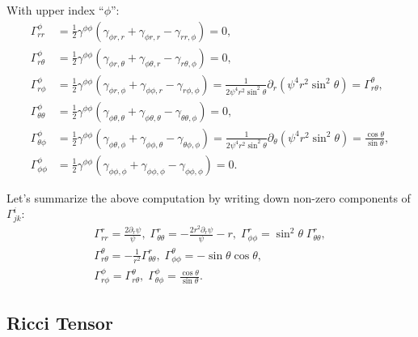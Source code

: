 \documentclass[aps,prd,preprint]{revtex4-1}
\begin{document}
With upper index ``$\phi$'':
\begin{align}
%
%
\Gamma^\phi_{rr} & = \frac{1}{2} \gamma^{\phi \phi} \left(
  \gamma_{\phi r,r} + \gamma_{\phi r,r} - \gamma_{rr,\phi} \right) = 0, \\
%
%
\Gamma^\phi_{r \theta} & = \frac{1}{2} \gamma^{\phi\phi} \left(
  \gamma_{\phi r, \theta} + \gamma_{\phi \theta, r} - \gamma_{r \theta, \phi} \right) = 0, \\
%
%
\Gamma^\phi_{r \phi} & =
 \frac{1}{2} \gamma^{\phi \phi} \left(
    \gamma_{\phi r, \phi} + \gamma_{\phi \phi, r} - \gamma_{r \phi, \phi} \right) =
\frac{1}{2 \psi^4 r^2 \sin^2 \theta} \partial_r \left( \psi^4 r^2 \sin^2 \theta \right) = \Gamma^{\theta}_{r \theta},  \\
%
%
\Gamma^\phi_{\theta \theta} & =
  \frac{1}{2} \gamma^{\phi \phi} \left(
    \gamma_{\phi \theta, \theta} + \gamma_{\phi \theta, \theta} - \gamma_{\theta \theta, \phi} \right) = 0, \\
%
%
\Gamma^\phi_{\theta \phi} & =
 \frac{1}{2} \gamma^{\phi \phi} \left(
    \gamma_{\phi \theta, \phi} + \gamma_{\phi \phi, \theta} - \gamma_{\theta \phi, \phi} \right) =
\frac{1}{2 \psi^4 r^2 \sin^2 \theta} \partial_\theta \left( \psi^4 r^2 \sin^2 \theta \right) =
\frac{\cos \theta}{\sin \theta}, \\
%
%
\Gamma^\phi_{\phi \phi} & =
  \frac{1}{2} \gamma^{\phi \phi} \left(
    \gamma_{\phi \phi, \phi} + \gamma_{\phi \phi, \phi} - \gamma_{\phi \phi, \phi} \right) = 0.
\end{align}

Let's summarize the above computation by writing down non-zero components of $\Gamma^i_{jk}$:
\begin{align}
\Gamma^r_{rr} = \frac{2 \partial_r \psi}{\psi}, \;
\Gamma^r_{\theta \theta} = -\frac{2 r^2 \partial_r \psi}{\psi} - r, \;
\Gamma^r_{\phi \phi} = \sin^2 \theta \; \Gamma^r_{\theta \theta},
\\
\Gamma^\theta_{r \theta} = -\frac{1}{r^2} \Gamma^r_{\theta \theta}, \;
\Gamma^\theta_{\phi \phi} = - \sin \theta \cos \theta,
\\
\Gamma^\phi_{r \phi} = \Gamma^{\theta}_{r \theta}, \;
\Gamma^\phi_{\theta \phi} = \frac{\cos \theta}{\sin \theta}.
\end{align}

\subsection{Ricci Tensor}
\end{document}
